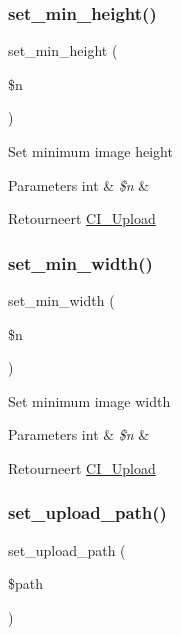 \subsubsection{\texorpdfstring{set\_min\_height()}{set\_min\_height()}}
{\footnotesize\ttfamily set\+\_\+min\+\_\+height (\begin{DoxyParamCaption}\item[{}]{\$n }\end{DoxyParamCaption})}

Set minimum image height


\begin{DoxyParams}[1]{Parameters}
int & {\em \$n} & \\
\hline
\end{DoxyParams}
\begin{DoxyReturn}{Retourneert}
\mbox{\hyperlink{class_c_i___upload}{C\+I\+\_\+\+Upload}} 
\end{DoxyReturn}
\mbox{\label{class_c_i___upload_afe47751e024dc9bf07333060628e0fb4}} 
\subsubsection{\texorpdfstring{set\_min\_width()}{set\_min\_width()}}
{\footnotesize\ttfamily set\+\_\+min\+\_\+width (\begin{DoxyParamCaption}\item[{}]{\$n }\end{DoxyParamCaption})}

Set minimum image width


\begin{DoxyParams}[1]{Parameters}
int & {\em \$n} & \\
\hline
\end{DoxyParams}
\begin{DoxyReturn}{Retourneert}
\mbox{\hyperlink{class_c_i___upload}{C\+I\+\_\+\+Upload}} 
\end{DoxyReturn}
\mbox{\label{class_c_i___upload_ab2407f3a942d9b203f54e21194cf040d}} 
\subsubsection{\texorpdfstring{set\_upload\_path()}{set\_upload\_path()}}
{\footnotesize\ttfamily set\+\_\+upload\+\_\+path (\begin{DoxyParamCaption}\item[{}]{\$path }\end{DoxyParamCaption})}

